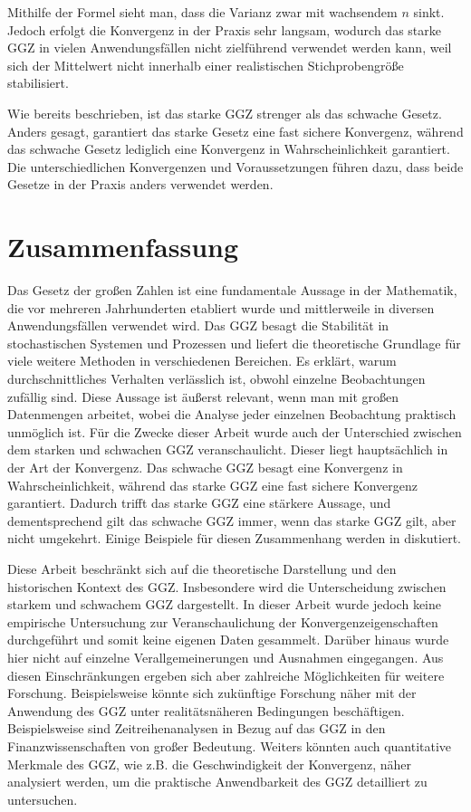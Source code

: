 \documentclass[12pt,a4paper]{article}
\begin{document}
Mithilfe der Formel sieht man, dass die Varianz zwar mit wachsendem \(n\) sinkt.
Jedoch erfolgt die Konvergenz in der Praxis sehr langsam, wodurch das starke GGZ in vielen Anwendungsfällen nicht zielführend verwendet werden kann, weil sich der Mittelwert nicht innerhalb einer realistischen Stichprobengröße stabilisiert.


Wie bereits beschrieben, ist das starke GGZ strenger als das schwache Gesetz.
Anders gesagt, garantiert das starke Gesetz eine fast sichere Konvergenz, während das schwache Gesetz lediglich eine Konvergenz in Wahrscheinlichkeit garantiert.
Die unterschiedlichen Konvergenzen und Voraussetzungen führen dazu, dass beide Gesetze in der Praxis anders verwendet werden.


\section{Zusammenfassung}
\label{sec:zusammenfassung}


Das Gesetz der großen Zahlen ist eine fundamentale Aussage in der Mathematik, die vor mehreren Jahrhunderten etabliert wurde und mittlerweile in diversen Anwendungsfällen verwendet wird.
Das GGZ besagt die Stabilität in stochastischen Systemen und Prozessen und liefert die theoretische Grundlage für viele weitere Methoden in verschiedenen Bereichen.
Es erklärt, warum durchschnittliches Verhalten verlässlich ist, obwohl einzelne Beobachtungen zufällig sind.
Diese Aussage ist äußerst relevant, wenn man mit großen Datenmengen arbeitet, wobei die Analyse jeder einzelnen Beobachtung praktisch unmöglich ist.
Für die Zwecke dieser Arbeit wurde auch der Unterschied zwischen dem starken und schwachen GGZ veranschaulicht.
Dieser liegt hauptsächlich in der Art der Konvergenz.
Das schwache GGZ besagt eine Konvergenz in Wahrscheinlichkeit, während das starke GGZ eine fast sichere Konvergenz garantiert.
Dadurch trifft das starke GGZ eine stärkere Aussage, und dementsprechend gilt das schwache GGZ immer, wenn das starke GGZ gilt, aber nicht umgekehrt.
Einige Beispiele für diesen Zusammenhang werden in \citet{stoyanov2013} diskutiert.


Diese Arbeit beschränkt sich auf die theoretische Darstellung und den historischen Kontext des GGZ.
Insbesondere wird die Unterscheidung zwischen starkem und schwachem GGZ dargestellt.
In dieser Arbeit wurde jedoch keine empirische Untersuchung zur Veranschaulichung der Konvergenzeigenschaften durchgeführt und somit keine eigenen Daten gesammelt.
Darüber hinaus wurde hier nicht auf einzelne Verallgemeinerungen und Ausnahmen eingegangen.
Aus diesen Einschränkungen ergeben sich aber zahlreiche Möglichkeiten für weitere Forschung.
Beispielsweise könnte sich zukünftige Forschung näher mit der Anwendung des GGZ unter realitätsnäheren Bedingungen beschäftigen.
Beispielsweise sind Zeitreihenanalysen in Bezug auf das GGZ in den Finanzwissenschaften von großer Bedeutung.
Weiters könnten auch quantitative Merkmale des GGZ, wie z.B. die Geschwindigkeit der Konvergenz, näher analysiert werden, um die praktische Anwendbarkeit des GGZ detailliert zu untersuchen.
\end{document}
